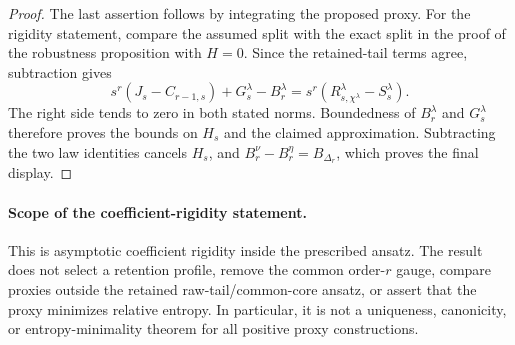 \begin{proof}
The last assertion follows by integrating the proposed proxy.  For the
rigidity statement, compare the assumed split with the exact split in the
proof of the robustness proposition with \(H=0\).  Since the retained-tail
terms agree, subtraction gives
\[
 s^r(J_s-C_{r-1,s})+G_s^\lambda-B_r^\lambda
   =s^r(R_{s,\chi^\lambda}^\lambda-S_s^\lambda).
\]
The right side tends to zero in both stated norms.  Boundedness of
\(B_r^\lambda\) and \(G_s^\lambda\) therefore proves the bounds on \(H_s\)
and the claimed approximation.  Subtracting the two law identities cancels
\(H_s\), and
\(B_r^\nu-B_r^\eta=B_{\Delta_r}\), which proves the final display.
\end{proof}

\paragraph{Scope of the coefficient-rigidity statement.}
This is asymptotic coefficient rigidity inside the prescribed ansatz.  The
result does not select a retention profile, remove the common
order-\(r\) gauge, compare proxies outside the retained raw-tail/common-core
ansatz, or assert that the proxy minimizes relative entropy.  In particular,
it is not a uniqueness, canonicity, or entropy-minimality theorem for all
positive proxy constructions.
